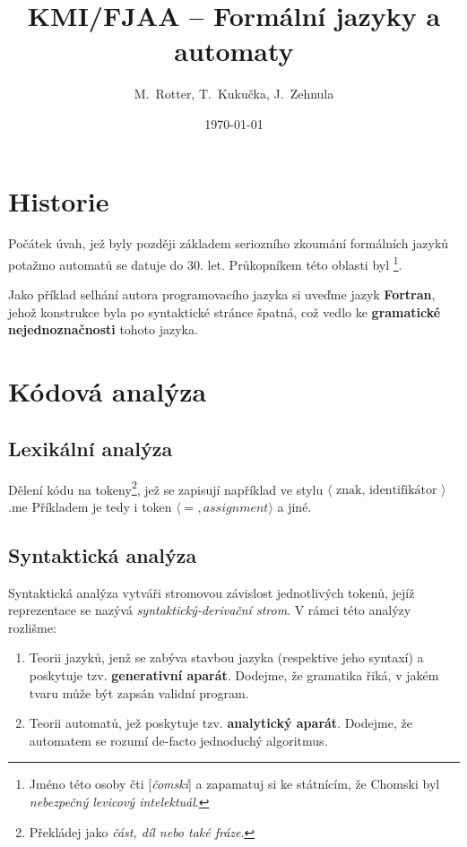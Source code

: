 \documentclass[10pt, a4paper, titlepage]{article}
\title{KMI/FJAA  -- Formální jazyky a automaty}
\author{M.~Rotter, T.~Kukučka, J.~Zehnula}
\date{\today}
\theoremstyle{note}
\begin{document}
\maketitle

\section{Historie}
Počátek úvah, jež byly později základem seriozního zkoumání formálních jazyků potažmo automatů se datuje do 30. let.
Průkopníkem této oblasti byl 
\footnote{Jméno této osoby čti [\emph{čomski}] a zapamatuj si ke státnícím, že Chomski byl \emph{nebezpečný levicový intelektuál}.}.

Jako příklad selhání autora programovacího jazyka si uveďme jazyk \textbf{Fortran}, jehož konstrukce byla po syntaktické stránce špatná,
což vedlo ke \textbf{gramatické nejednoznačnosti} tohoto jazyka.

\section{Kódová analýza}
\subsection{Lexikální analýza}
Dělení kódu na tokeny\footnote{Překládej jako \emph{část, díl nebo také fráze}.}, jež se zapisují například ve stylu
$\langle\text{ znak, identifikátor }\rangle$.me
Příkladem je tedy i token $\langle =, assignment \rangle$ a jiné.

\subsection{Syntaktická analýza}
Syntaktická analýza vytváři stromovou závislost jednotlivých tokenů, jejíž reprezentace se nazývá \emph{syntaktický-derivační strom}.
V rámci této analýzy rozlišme:
\begin{enumerate}
\item
Teorii jazyků, jenž se zabýva stavbou jazyka (respektive jeho syntaxí) a poskytuje tzv. \textbf{generativní aparát}.
Dodejme, že gramatika řiká, v jakém tvaru může být zapsán validní program.

\item
Teorii automatů, jež poskytuje tzv. \textbf{analytický aparát}.
Dodejme, že automatem se rozumí de-facto jednoduchý algoritmus.
\end{enumerate}
\end{document}
